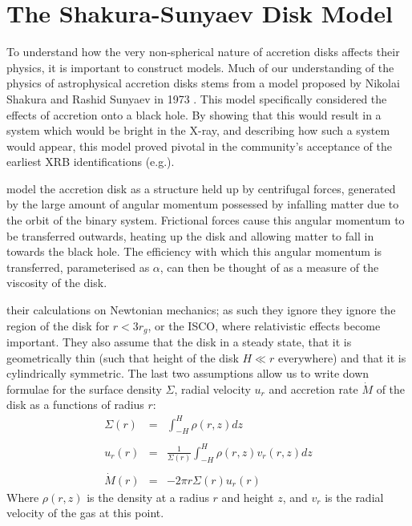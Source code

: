 \section{The Shakura-Sunyaev Disk Model}

\par To understand how the very non-spherical nature of accretion disks affects their physics, it is important to construct models.  Much of our understanding of the physics of astrophysical accretion disks stems from a model proposed by Nikolai Shakura and Rashid Sunyaev in 1973 \citep{Shakura_Disk}.  This model specifically considered the effects of accretion onto a black hole.  By showing that this would result in a system which would be bright in the X-ray, and describing how such a system would appear, this model proved pivotal in the community's acceptance of the earliest XRB identifications (e.g.\citealp{Bolton_CygX1}).
\par \citet{Shakura_Disk} model the accretion disk as a structure held up by centrifugal forces, generated by the large amount of angular momentum possessed by infalling matter due to the orbit of the binary system.  Frictional forces cause this angular momentum to be transferred outwards, heating up the disk and allowing matter to fall in towards the black hole.  The efficiency with which this angular momentum is transferred, parameterised as $\alpha$, can then be thought of as a measure of the viscosity of the disk.
\par \citet{Shakura_Disk} their calculations on Newtonian mechanics; as such they ignore they ignore the region of the disk for $r<3r_g$, or the ISCO, where relativistic effects become important.  They also assume that the disk in a steady state, that it is geometrically thin (such that height of the disk $H\ll r$ everywhere) and that it is cylindrically symmetric.  The last two assumptions allow us to write down formulae for the surface density $\Sigma$, radial velocity $u_r$ and accretion rate $\dot{M}$ of the disk as a functions of radius $r$:
\begin{eqnarray}
\Sigma(r)&=&\int_{-H}^H\rho(r,z) dz\label{eq:base1}\\\nonumber \\
u_r(r)&=&\frac{1}{\Sigma(r)}\int_{-H}^H\rho(r,z)v_r(r,z)dz\label{eq:base2}\\\nonumber \\
\dot{M}(r)&=&-2\pi r\Sigma(r) u_r(r)\label{eq:base3}
\end{eqnarray}
Where $\rho(r,z)$ is the density at a radius $r$ and height $z$, and $v_r$ is the radial velocity of the gas at this point.
